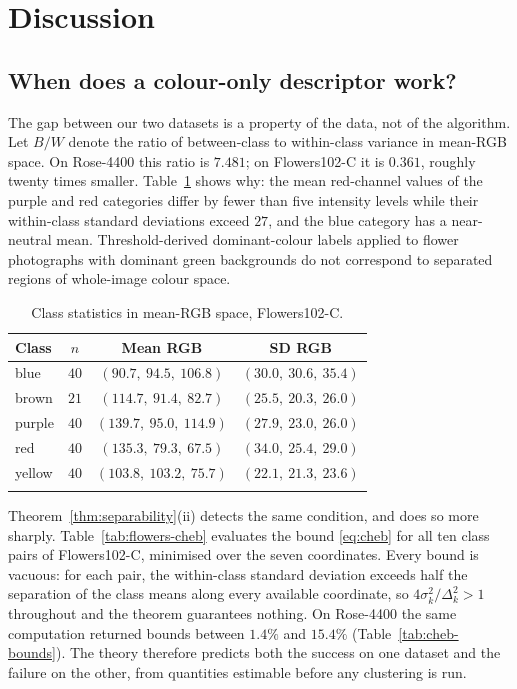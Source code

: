 \documentclass[pdflatex,sn-basic]{sn-jnl}
\theoremstyle{thmstyleone}%
\theoremstyle{thmstyletwo}%
\theoremstyle{thmstylethree}%
\begin{document}
\section{Discussion}\label{sec:discussion}

\subsection{When does a colour-only descriptor work?}\label{sec:failure}

The gap between our two datasets is a property of the data, not of the
algorithm. Let $B/W$ denote the ratio of between-class to within-class variance
in mean-RGB space. On Rose-4400 this ratio is $7.481$; on Flowers102-C it is
$0.361$, roughly twenty times smaller. Table~\ref{tab:flowers-stats} shows why:
the mean red-channel values of the purple and red categories differ by fewer
than five intensity levels while their within-class standard deviations exceed
$27$, and the blue category has a near-neutral mean. Threshold-derived dominant-colour labels
applied to flower photographs with dominant green backgrounds do not
correspond to separated regions of whole-image colour space.

\begin{table}[h]
\centering
\caption{Class statistics in mean-RGB space,
Flowers102-C.}\label{tab:flowers-stats}
\begin{tabular}{@{}lccc@{}}
\toprule
Class & $n$ & Mean RGB & SD RGB \\
\midrule
blue   & $40$ & $(90.7,\ 94.5,\ 106.8)$  & $(30.0,\ 30.6,\ 35.4)$ \\
brown  & $21$ & $(114.7,\ 91.4,\ 82.7)$  & $(25.5,\ 20.3,\ 26.0)$ \\
purple & $40$ & $(139.7,\ 95.0,\ 114.9)$ & $(27.9,\ 23.0,\ 26.0)$ \\
red    & $40$ & $(135.3,\ 79.3,\ 67.5)$  & $(34.0,\ 25.4,\ 29.0)$ \\
yellow & $40$ & $(103.8,\ 103.2,\ 75.7)$ & $(22.1,\ 21.3,\ 23.6)$ \\
\botrule
\end{tabular}
\end{table}

Theorem~\ref{thm:separability}(ii) detects the same condition, and does so
more sharply. Table~\ref{tab:flowers-cheb} evaluates the bound
\eqref{eq:cheb} for all ten class pairs of Flowers102-C, minimised over the
seven coordinates. Every bound is vacuous: for each pair, the within-class
standard deviation exceeds half the separation of the class means along every
available coordinate, so $4\sigma_k^2/\Delta_k^2>1$ throughout and the theorem
guarantees nothing. On Rose-4400 the same computation returned bounds between
$1.4\%$ and $15.4\%$ (Table~\ref{tab:cheb-bounds}). The theory therefore
predicts both the success on one dataset and the failure on the other, from
quantities estimable before any clustering is run.
\end{document}
